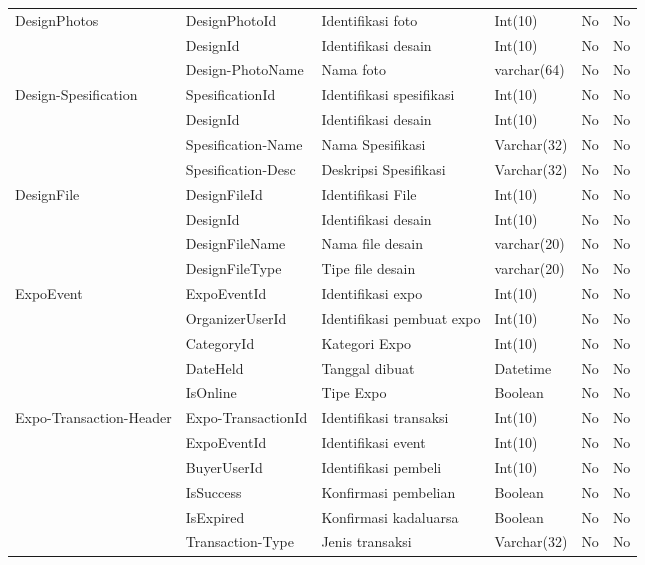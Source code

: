 \begin{longtable}{| p{2.2cm} | p{2.5cm} | p{3.4cm} | p{2.2cm} | l | p{1.3cm} |}
		DesignPhotos	& DesignPhotoId		& Identifikasi foto		& Int(10)		& No & No \\
						& DesignId			& Identifikasi desain	& Int(10)		& No & No \\
						& Design-PhotoName	& Nama foto				& varchar(64)	& No & No \\ \hline
						
		Design-Spesification	& SpesificationId	& Identifikasi spesifikasi	& Int(10)		& No & No \\
								& DesignId			& Identifikasi desain		& Int(10)		& No & No \\
								& Spesification-Name	& Nama Spesifikasi			& Varchar(32)	& No & No \\
								& Spesification-Desc	& Deskripsi Spesifikasi		& Varchar(32)	& No & No \\ \hline
		
		DesignFile	& DesignFileId		& Identifikasi File		& Int(10)		& No & No \\
					& DesignId			& Identifikasi desain	& Int(10)		& No & No \\ 
					& DesignFileName	& Nama file desain		& varchar(20)	& No & No \\
					& DesignFileType	& Tipe file desain		& varchar(20)	& No & No \\ \hline
		
		ExpoEvent	& ExpoEventId		& Identifikasi expo			& Int(10)	& No & No \\
					& OrganizerUserId	& Identifikasi pembuat expo	& Int(10)	& No & No \\
					& CategoryId		& Kategori Expo				& Int(10)	& No & No \\
					& DateHeld			& Tanggal dibuat			& Datetime	& No & No \\
					& IsOnline			& Tipe Expo					& Boolean	& No & No \\ \hline

		Expo-Transaction-Header	& Expo-TransactionId	& Identifikasi transaksi	& Int(10)		& No & No \\
								& ExpoEventId		& Identifikasi event		& Int(10)		& No & No \\
								& BuyerUserId		& Identifikasi pembeli		& Int(10)		& No & No \\
								& IsSuccess 		& Konfirmasi pembelian		& Boolean		& No & No \\
								& IsExpired			& Konfirmasi kadaluarsa		& Boolean		& No & No \\
								& Transaction-Type	& Jenis transaksi			& Varchar(32)	& No & No \\ \hline
		

\end{longtable}
